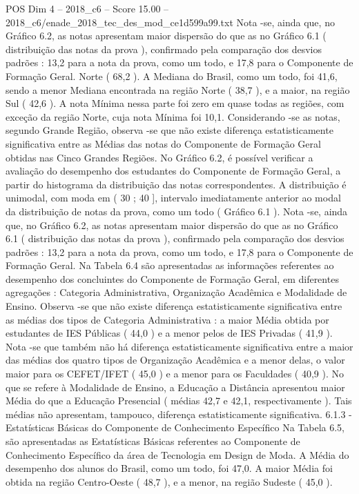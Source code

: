 \begin{textsample}{POS Dim 4 – 2018\_c6 – Score 15.00 – 2018\_c6/enade\_2018\_tec\_des\_mod\_ce1d599a99.txt}
Nota -se, ainda que, no Gráfico 6.2, as notas apresentam maior dispersão do que as no Gráfico 6.1 ( distribuição das notas da prova ), confirmado pela comparação dos desvios padrões : 13,2 para a nota da prova, como um todo, e 17,8 para o Componente de Formação Geral.
Norte ( 68,2 ).
A Mediana do Brasil, como um todo, foi 41,6, sendo a menor Mediana encontrada na região Norte ( 38,7 ), e a maior, na região Sul ( 42,6 ).
A nota Mínima nessa parte foi zero em quase todas as regiões, com exceção da região Norte, cuja nota Mínima foi 10,1.
Considerando -se as notas, segundo Grande Região, observa -se que não existe diferença estatisticamente significativa entre as Médias das notas do Componente de Formação Geral obtidas nas Cinco Grandes Regiões.
No Gráfico 6.2, é possível verificar a avaliação do desempenho dos estudantes do Componente de Formação Geral, a partir do histograma da distribuição das notas correspondentes.
A distribuição é unimodal, com moda em ( 30 ; 40 ], intervalo imediatamente anterior ao modal da distribuição de notas da prova, como um todo ( Gráfico 6.1 ).
Nota -se, ainda que, no Gráfico 6.2, as notas apresentam maior dispersão do que as no Gráfico 6.1 ( distribuição das notas da prova ), confirmado pela comparação dos desvios padrões : 13,2 para a nota da prova, como um todo, e 17,8 para o Componente de Formação Geral.
Na Tabela 6.4 são apresentadas as informações referentes ao desempenho dos concluintes do Componente de Formação Geral, em diferentes agregações : Categoria Administrativa, Organização Acadêmica e Modalidade de Ensino.
Observa -se que não existe diferença estatisticamente significativa entre as médias dos tipos de Categoria Administrativa : a maior Média obtida por estudantes de IES Públicas ( 44,0 ) e a menor pelos de IES Privadas ( 41,9 ).
Nota -se que também não há diferença estatisticamente significativa entre a maior das médias dos quatro tipos de Organização Acadêmica e a menor delas, o valor maior para os CEFET/IFET ( 45,0 ) e a menor para os Faculdades ( 40,9 ).
No que se refere à Modalidade de Ensino, a Educação a Distância apresentou maior Média do que a Educação Presencial ( médias 42,7 e 42,1, respectivamente ).
Tais médias não apresentam, tampouco, diferença estatisticamente significativa. 6.1.3 - Estatísticas Básicas do Componente de Conhecimento Específico Na Tabela 6.5, são apresentadas as Estatísticas Básicas referentes ao Componente de Conhecimento Específico da área de Tecnologia em Design de Moda.
A Média do desempenho dos alunos do Brasil, como um todo, foi 47,0.
A maior Média foi obtida na região Centro-Oeste ( 48,7 ), e a menor, na região Sudeste ( 45,0 ).

\end{textsample}
